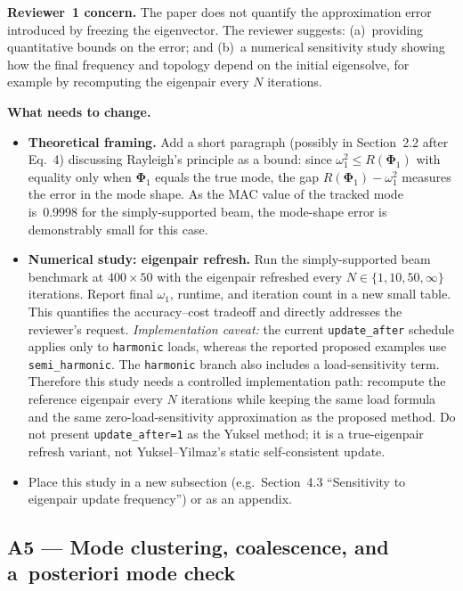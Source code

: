 \documentclass[12pt,a4paper]{article}
\begin{document}
\textbf{Reviewer~1 concern.}  The paper does not quantify the approximation
error introduced by freezing the eigenvector. The reviewer suggests:
(a)~providing quantitative bounds on the error; and (b)~a numerical
sensitivity study showing how the final frequency and topology depend on the
initial eigensolve, for example by recomputing the eigenpair every $N$
iterations.

\textbf{What needs to change.}
\begin{itemize}[leftmargin=1.6em]
  \item \textbf{Theoretical framing.}  Add a short paragraph (possibly in
        Section~2.2 after Eq.~4) discussing Rayleigh's principle as a bound:
        since $\omega_1^2 \leq R(\boldsymbol{\Phi}_1)$ with equality only
        when $\boldsymbol{\Phi}_1$ equals the true mode, the gap
        $R(\boldsymbol{\Phi}_1) - \omega_1^2$ measures the error in the
        mode shape.  As the MAC value of the tracked mode is~0.9998 for the
        simply-supported beam, the mode-shape error is demonstrably small for
        this case.
  \item \textbf{Numerical study: eigenpair refresh.}  Run the simply-supported
        beam benchmark at $400{\times}50$ with the eigenpair refreshed every
        $N \in \{1, 10, 50, \infty\}$ iterations. Report final
        $\omega_1$, runtime, and iteration count in a new small table. This
        quantifies the accuracy--cost tradeoff and directly addresses the
        reviewer's request.
        \emph{Implementation caveat:} the current \texttt{update\_after}
        schedule applies only to \texttt{harmonic} loads, whereas the reported
        proposed examples use \texttt{semi\_harmonic}.  The \texttt{harmonic}
        branch also includes a load-sensitivity term.  Therefore this study
        needs a controlled implementation path: recompute the reference
        eigenpair every $N$ iterations while keeping the same load formula and
        the same zero-load-sensitivity approximation as the proposed method.
        Do not present \texttt{update\_after=1} as the Yuksel method; it is a
        true-eigenpair refresh variant, not Yuksel--Yilmaz's static
        self-consistent update.
  \item Place this study in a new subsection (e.g.\ Section~4.3
        ``Sensitivity to eigenpair update frequency'') or as an appendix.
\end{itemize}

\subsection{A5 — Mode clustering, coalescence, and a~posteriori mode check}
\end{document}
